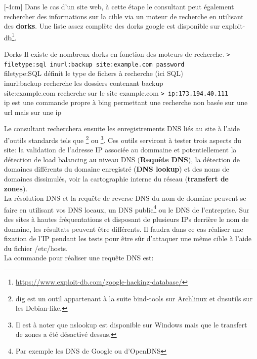 \documentclass[twoside,a4paper,12pt,titlepage]{book}
\newcommand{\MarginPar}[2]{\marginnote{\scriptsize #1}[#2]}
\begin{document}
\MarginPar{\textbf{Whois}: Pour contôler le possesseur de la cible}{-4cm}
Dans le cas d'un site web, à cette étape le consultant peut également rechercher des informations sur la cible via un moteur de recherche en utilisant des \textbf{\gls{dorks}}. Une liste assez complète des dorks google est disponible sur exploit-db\footnote{\url{https://www.exploit-db.com/google-hacking-database/}}.\\
\begin{FlagConsole}{Dorks}
	Il existe de nombreux dorks en fonction des moteurs de recherche.
	\texttt{> filetype:sql inurl:backup site:example.com password}\\
	filetype:SQL définit le type de fichers à recherche (ici SQL)\\
	inurl:backup recherche les dossiers contenant backup\\
	site:example.com recherche sur le site example.com
	\texttt{> ip:173.194.40.111}\\
	ip est une commande propre à bing permettant une recherche non basée sur une url mais sur une ip
\end{FlagConsole}
Le consultant recherchera ensuite les enregistrements \gls{DNS} liés au site à l'aide d'outils standards tels que \footnote{dig est un outil appartenant à la suite bind-tools sur Archlinux et dnsutils sur les Debian-like.} ou \footnote{Il est à noter que nslookup est disponible sur Windows mais que le transfert de zones a été désactivé dessus.}. Ces outils serviront à tester trois aspects du site: la validation de l'adresse IP associée au dommaine et potentiellement la détection de load balancing au niveau DNS (\textbf{Requête DNS}), la détection de domaines différents du domaine enregistré (\textbf{DNS lookup}) et des noms de domaines dissimulés, voir la cartographie interne du réseau (\textbf{transfert de zones}).\\
La résolution \gls{DNS}  et la requête de reverse DNS du nom de domaine peuvent se faire en utilisant vos DNS locaux, un DNS public\footnote{Par exemple les DNS de Google ou d'OpenDNS} ou le DNS de l'entreprise. Sur des sites à hautes fréquentations et disposant de plusieurs IPs derrière le nom de domaine, les résultats peuvent être différents. Il faudra dans ce cas réaliser une fixation de l'IP pendant les tests pour être sûr d'attaquer une même cible à l'aide du fichier /etc/hosts.\\
La commande  pour réaliser une requête DNS est:
\end{document}
